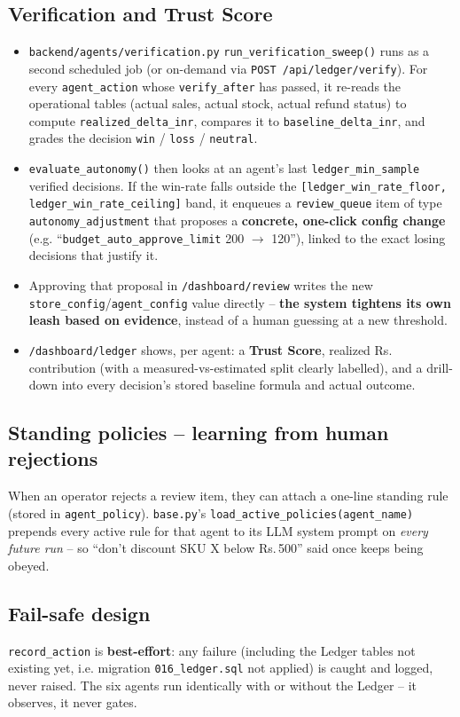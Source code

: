\documentclass[11pt,a4paper]{article}
\newcommand{\Rs}{Rs.\,}
\begin{document}
\subsection{Verification and Trust Score}
\begin{itemize}[itemsep=2pt]
\item \texttt{backend/agents/verification.py} \texttt{run\_verification\_sweep()} runs as a
second scheduled job (or on-demand via \texttt{POST /api/ledger/verify}). For every
\texttt{agent\_action} whose \texttt{verify\_after} has passed, it re-reads the operational
tables (actual sales, actual stock, actual refund status) to compute
\texttt{realized\_delta\_inr}, compares it to \texttt{baseline\_delta\_inr}, and grades the
decision \texttt{win} / \texttt{loss} / \texttt{neutral}.
\item \texttt{evaluate\_autonomy()} then looks at an agent's last
\texttt{ledger\_min\_sample} verified decisions. If the win-rate falls outside the
\texttt{[ledger\_win\_rate\_floor, ledger\_win\_rate\_ceiling]} band, it enqueues a
\texttt{review\_queue} item of type \texttt{autonomy\_adjustment} that proposes a
\textbf{concrete, one-click config change} (e.g. ``\texttt{budget\_auto\_approve\_limit}
200 $\to$ 120''), linked to the exact losing decisions that justify it.
\item Approving that proposal in \texttt{/dashboard/review} writes the new
\texttt{store\_config}/\texttt{agent\_config} value directly -- \textbf{the system tightens its
own leash based on evidence}, instead of a human guessing at a new threshold.
\item \texttt{/dashboard/ledger} shows, per agent: a \textbf{Trust Score}, realized
\Rs{} contribution (with a measured-vs-estimated split clearly labelled), and a
drill-down into every decision's stored baseline formula and actual outcome.
\end{itemize}

\subsection{Standing policies -- learning from human rejections}
When an operator rejects a review item, they can attach a one-line standing rule
(stored in \texttt{agent\_policy}). \texttt{base.py}'s \texttt{load\_active\_policies(agent\_name)}
prepends every active rule for that agent to its LLM system prompt on \emph{every future run} --
so ``don't discount SKU X below \Rs{}500'' said once keeps being obeyed.

\subsection{Fail-safe design}
\texttt{record\_action} is \textbf{best-effort}: any failure (including the Ledger tables not
existing yet, i.e. migration \texttt{016\_ledger.sql} not applied) is caught and logged, never
raised. The six agents run identically with or without the Ledger -- it observes, it never
gates.
\end{document}
